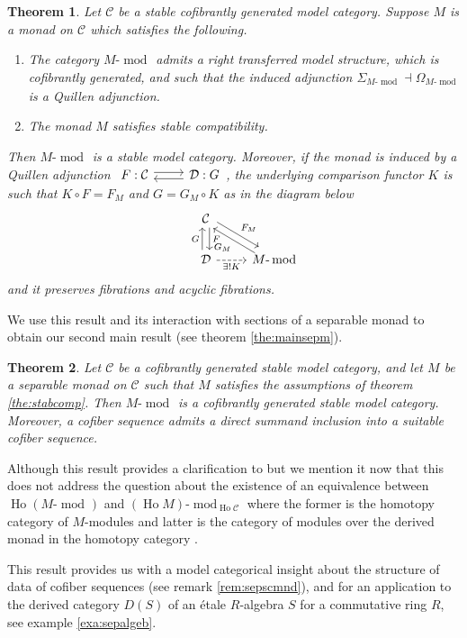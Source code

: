 \documentclass{article}
\newcommand{\cC}{\mathcal{C}}
\newcommand{\cD}{\mathcal{D}}
\newcommand{\adjunction}[4]{\begin{tikzcd}[ampersand replacement=\&] #1 : #2 \arrow[r, shift left] \& #3 : #4 \arrow[l, shift left] \end{tikzcd}}
\newcommand{\module}[2][]{#2\text{-}\modop_{#1}}
\DeclareMathOperator{\Ho}{Ho}
\DeclareMathOperator{\modop}{mod}
\newtheorem*{theorem*}{Theorem}
\theoremstyle{definition}
\theoremstyle{remark}
\begin{document}
\begin{theorem*}
    
Let $\cC$ be a stable cofibrantly generated model category.
  Suppose $M$ is a monad on $\cC$ which satisfies the following.
  \begin{enumerate}
    \item
      The category $\module{M}$ admits a right transferred model structure, which is 
      cofibrantly generated, and such that the induced adjunction $\Sigma_{\module{M}}
      \dashv \Omega_{\module{M}}$ is a Quillen adjunction. 
    \item The monad $M$ satisfies stable compatibility.
  \end{enumerate}
  Then $\module{M}$ is a stable model category. Moreover, if the monad is induced by a
  Quillen adjunction $\adjunction{F}{\cC}{\cD}{G}$, the underlying comparison functor $K$
  is such that $K \circ F=F_{M}$ and $G=G_{M} \circ K$ as in the diagram below   
  \[
    \begin{tikzcd}
      & \cC  \arrow[dr,"F_{M}", shift left=1mm] \arrow[d,"F", shift left=1mm] \\
      & \cD \arrow[dashrightarrow,r,"\exists !K" below] \arrow[u,"G",shift left=1mm]& \module{M} \arrow[ul, "G_{M}",shift left=1mm] 
    \end{tikzcd}
  \]
  and it preserves fibrations and acyclic fibrations.


\end{theorem*}
We use this result and its interaction with sections of a separable monad to obtain our second main result (see theorem \ref{the:mainsepm}).

\begin{theorem*}
    Let $\cC$ be a cofibrantly generated stable model category, and let $M$ be a 
separable monad on $\cC$ such that $M$ satisfies the assumptions of theorem 
\ref{the:stabcomp}. Then $\module{M}$ is a cofibrantly generated stable model 
category. Moreover, a cofiber sequence admits a direct summand inclusion into a suitable
cofiber sequence.
\end{theorem*}
Although this result provides a clarification to \cite[remark 6.1]{balmer:septrcat} but we mention it now that this does not address the question about the existence of an equivalence between $\Ho(\module{M})$ and $\module[\Ho \cC]{(\Ho M)}$ where the former is the homotopy category of $M$-modules and latter is the category of modules over the derived monad in the homotopy category .

This result provides us with a model categorical insight about the structure of data of cofiber sequences (see remark \ref{rem:sepscmnd}), and for an application to the derived category $D(S)$ of an \'etale  $R$-algebra $S$ for a commutative ring $R$, see example \ref{exa:sepalgeb}.
\end{document}
